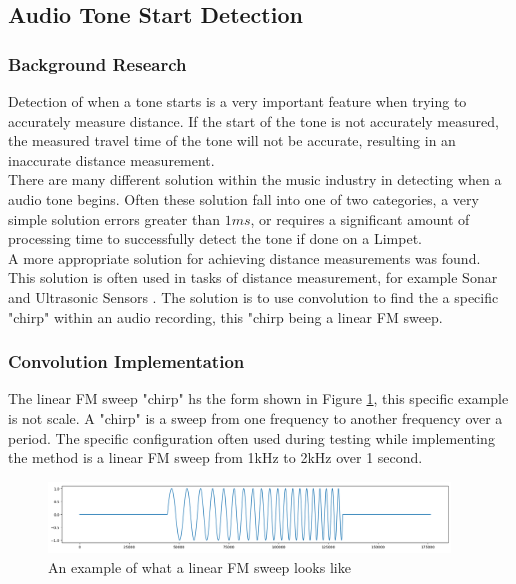 \subsection{Audio Tone Start Detection}
\subsubsection{Background Research}
Detection of when a tone starts is a very important feature when trying to accurately measure distance. If the start of the tone is not accurately measured, the measured travel time of the tone will not be accurate, resulting in an inaccurate distance measurement.\\

There are many different solution within the music industry in detecting when a audio tone begins. Often these solution fall into one of two categories, a very simple solution errors greater than $1ms$, or requires a significant amount of processing time to successfully detect the tone if done on a Limpet.\\

A more appropriate solution for achieving distance measurements was found. This solution is often used in tasks of distance measurement, for example Sonar and Ultrasonic Sensors \cite{toa_akeem_2020}. The solution is to use convolution to find the a specific "chirp" within an audio recording, this "chirp being a linear FM sweep.

\subsubsection{Convolution Implementation}
The linear FM sweep "chirp" hs the form shown in Figure \ref{fig:linear_fm_sweep}, this specific example is not scale. A "chirp" is a sweep from one frequency to another frequency over a period. The specific configuration often used during testing while implementing the method is a linear FM sweep from 1kHz to 2kHz over 1 second.

\begin{figure}[H]
	\centering
	\noindent\includegraphics[width=0.95\textwidth]{images/linear_fm_sweep.png}
	\caption{An example of what a linear FM sweep looks like}
	\label{fig:linear_fm_sweep}
\end{figure}


